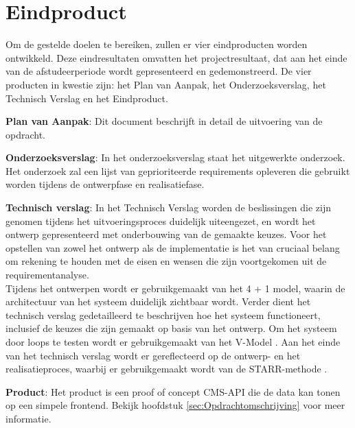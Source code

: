 \section{Eindproduct}
Om de gestelde doelen te bereiken, zullen er vier eindproducten worden ontwikkeld.
Deze eindresultaten omvatten het projectresultaat, dat aan het einde van de afstudeerperiode wordt gepresenteerd en gedemonstreerd.
De vier producten in kwestie zijn: het Plan van Aanpak, het Onderzoeksverslag, het Technisch Verslag en het Eindproduct.

\whitespace[2]
\textbf{Plan van Aanpak}: Dit document beschrijft in detail de uitvoering van de opdracht.

\whitespace[2]
\textbf{Onderzoeksverslag}: In het onderzoeksverslag staat het uitgewerkte onderzoek.
Het onderzoek zal een lijst van geprioriteerde requirements opleveren die gebruikt worden tijdens de ontwerpfase en realisatiefase.

\whitespace[2]
\textbf{Technisch verslag}: In het Technisch Verslag worden de beslissingen die zijn genomen tijdens het uitvoeringsproces duidelijk uiteengezet, en wordt het ontwerp gepresenteerd met onderbouwing van de gemaakte keuzes.
Voor het opstellen van zowel het ontwerp als de implementatie is het van cruciaal belang om rekening te houden met de eisen en wensen die zijn voortgekomen uit de requirementanalyse. \\
Tijdens het ontwerpen wordt er gebruikgemaakt van het 4 + 1 model, waarin de architectuur van het systeem duidelijk zichtbaar wordt.
Verder dient het technisch verslag gedetailleerd te beschrijven hoe het systeem functioneert, inclusief de keuzes die zijn gemaakt op basis van het ontwerp.
Om het systeem door loops te testen wordt er gebruikgemaakt van het V-Model \Parencite{VModel}.
Aan het einde van het technisch verslag wordt er gereflecteerd op de ontwerp- en het realisatieproces, waarbij er gebruikgemaakt wordt van de STARR-methode \Parencite{STARR}.

\whitespace[2]
\textbf{Product}: Het product is een proof of concept \gls{CMS}-API die de data kan tonen op een simpele frontend.
Bekijk hoofdstuk \ref{sec:Opdrachtomschrijving} voor meer informatie.
